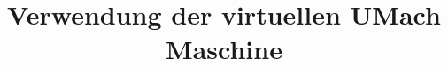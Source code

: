 \documentclass[fontsize=12pt,parskip=full,index=totoc,listof=totoc,titlepage]
{scrartcl}
\title{Verwendung der virtuellen UMach Maschine}
\author{}
\begin{document}
\maketitle
\tableofcontents













\appendix
\lstlistoflistings
\printindex
\end{document}
